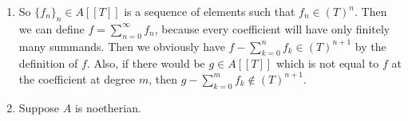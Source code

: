 \newcommand{\sheet}{3}




\maketitle

\begin{exercise}{1}
    \begin{enumerate}
        \item So $\{f_n\}_n \in A[[T]]$ is a sequence of elements such that $f_n
            \in {(T)}^n$. Then we can define $f = \sum^{\infty}_{n = 0} f_n$,
            because every coefficient will have only finitely many summands.
            Then we obviously have $f - \sum^{n}_{k = 0} f_k \in {(T)}^{n+1}$ by
            the definition of $f$. Also, if there would be $g \in A[[T]]$ which
            is not equal to $f$ at the coefficient at degree $m$, then $g -
            \sum^{m}_{k = 0} f_k \notin {(T)}^{n+1}$.
        \item Suppose $A$ is noetherian.
    \end{enumerate}
\end{exercise}


